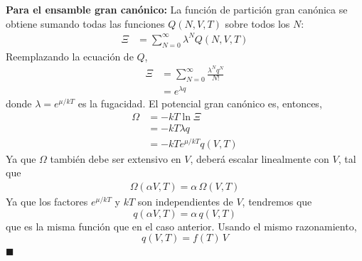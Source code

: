 \documentclass[]{article}
\numberwithin{equation}{section}
\newcommand{\0}{\textcolor{gray}{0}}
\newcommand{\qed}{\hfill\(\blacksquare\)}
\begin{document}
\textbf{Para el ensamble gran canónico:} La función de partición gran canónica se obtiene sumando todas las funciones $Q(N,V,T)$ sobre todos los $N$:
\begin{align*}
	\Xi &= \sum_{N=0}^\infty \lambda^N Q(N,V,T)
\end{align*}
Reemplazando la ecuación de $Q$,
\begin{align*}
	\Xi &= \sum_{N=0}^\infty \frac{\lambda^N q^N}{N!}\\
	&= e^{\lambda q}
\end{align*}
donde $\lambda = e^{\mu/kT}$ es la fugacidad. El potencial gran canónico es, entonces,
\begin{align*}
	\Omega &= -kT\ln\Xi\\
	&= -kT\lambda q\\
	&= -kT e^{\mu/kT} q(V,T)
\end{align*}
Ya que $\Omega$ también debe ser extensivo en $V$, deberá escalar linealmente con $V$, tal que
\begin{align*}
	\Omega(\alpha V,T) = \alpha\,\Omega(V,T)
\end{align*}
Ya que los factores $e^{\mu/kT}$ y $kT$ son independientes de $V$, tendremos que
\begin{equation*}
	q(\alpha V, T) = \alpha\, q(V, T)
\end{equation*}
que es la misma función que en el caso anterior. Usando el mismo razonamiento,
\begin{equation}
	q(V,T) = f(T)\,V
\end{equation}
\qed

\end{document}
